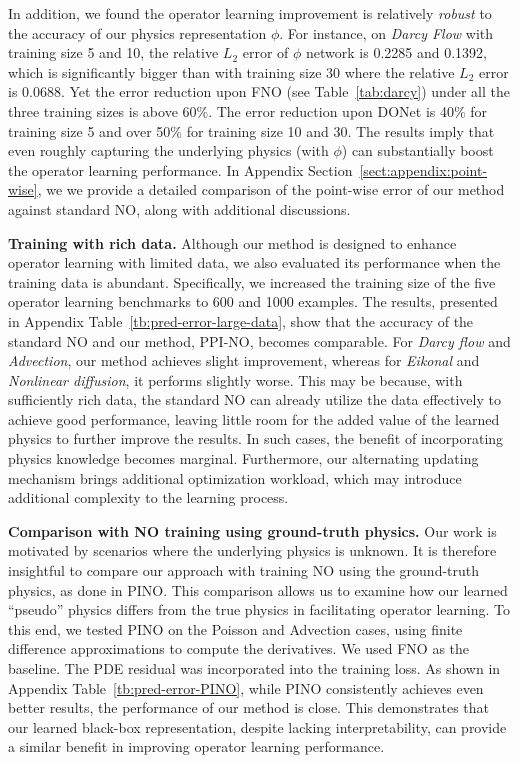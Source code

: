In addition, we found the operator learning improvement is relatively \textit{robust} to the accuracy of our physics representation $\phi$. For instance, on \textit{Darcy Flow} with training size 5 and 10, the relative $L_2$ error of $\phi$ network is 0.2285 and 0.1392, which is significantly bigger than with training size 30  where the relative $L_2$ error is 0.0688. Yet the error reduction upon FNO (see Table~\ref{tab:darcy}) under all the three training sizes is above 60\%. The error reduction upon DONet is 40\% for training size 5 and over 50\% for training size 10 and 30. 
The results imply that even roughly capturing the underlying physics (with $\phi$) can substantially boost the operator learning performance. In Appendix Section~\ref{sect:appendix:point-wise}, we we provide a detailed comparison of the point-wise error of our method against standard NO, along with additional discussions.


\noindent\textbf{Training with rich data.}  Although our method is designed to enhance operator learning with limited data, we also evaluated its performance when the training data is abundant. Specifically, we increased the training size of the five operator learning benchmarks to 600 and 1000 examples. The results, presented in Appendix Table~\ref{tb:pred-error-large-data}, show that the accuracy of the standard NO and our method, PPI-NO, becomes comparable. For \textit{Darcy flow} and \textit{Advection}, our method achieves slight improvement, whereas for \textit{Eikonal} and \textit{Nonlinear diffusion}, it performs slightly worse. This may be because, with sufficiently rich data, the standard NO can already utilize the data effectively to achieve good performance, leaving little room for the added value of the learned physics to further improve the results. In such cases, the benefit of incorporating physics knowledge becomes marginal. Furthermore, our alternating updating mechanism brings additional optimization workload, which may introduce additional complexity to the learning process.


\noindent\textbf{Comparison with NO training using ground-truth physics.}  
Our work is motivated by scenarios where the underlying physics is unknown. It is therefore insightful to compare our approach with training NO using the ground-truth physics, as done in PINO. This comparison allows us to examine how our learned ``pseudo'' physics differs from the true physics in facilitating operator learning. To this end, we tested PINO on the Poisson and Advection cases, using finite difference approximations to compute the derivatives. We used FNO as the baseline. The PDE residual was incorporated into the training loss. As shown in Appendix Table~\ref{tb:pred-error-PINO}, while PINO consistently achieves even better results, the performance of our method is close. This demonstrates that our learned black-box representation, despite lacking interpretability, can provide a similar benefit in improving operator learning performance.



